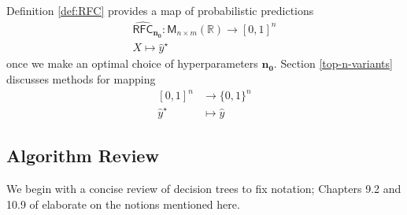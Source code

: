 \documentclass[11pt]{article}
\theoremstyle{definition}
\numberwithin{equation}{section}
\begin{document}
Definition \ref{def:RFC} provides a map of probabilistic predictions
\begin{equation}\label{eq:RFC-Theta}
\begin{gathered}
\operatorname{\widehat{\mathsf{RFC}}}_\mathbf{n_0} : 
\mathsf{M}_{n \times m} (\mathbb{R}) \rightarrow [0, 1]^n \\ 
X \mapsto \hat{y}^\star
\end{gathered}
\end{equation}
once we make an optimal choice of hyperparameters $\mathbf{n_0}$.
Section \ref{top-n-variants} discusses methods for mapping
\begin{equation}
\begin{aligned}
{[0, 1]}^{n} &\rightarrow \{0, 1\}^n \\ 
\hat{y}^\star  &\mapsto \hat{y}
\end{aligned}
\end{equation}


\hypertarget{algorithm-review}{%
  \subsection{Algorithm Review}\label{algorithm-review}}

We begin with a concise review of decision trees to fix notation; Chapters 9.2 and 10.9 of \cite{hastieElementsStatisticalLearning2009} elaborate on the notions mentioned here.
\end{document}

